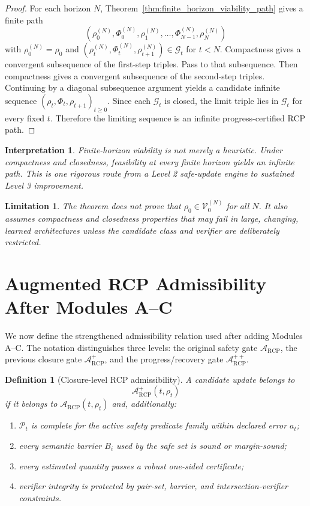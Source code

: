 \documentclass[11pt]{article}
\newtheorem{definition}[theorem]{Definition}
\newtheorem{interpretation}[theorem]{Interpretation}
\newtheorem{limitation}[theorem]{Limitation}
\newcommand{\Acal}{\mathcal{A}}
\newcommand{\Pcal}{\mathcal{P}}
\newcommand{\Gcal}{\mathcal{G}}
\newcommand{\1}{\mathbf{1}}
\newcommand{\RCP}{\mathrm{RCP}}
\providecommand{\Vcal}{\mathcal{V}}
\begin{document}
\begin{proof}
For each horizon \(N\), Theorem~\ref{thm:finite_horizon_viability_path} gives a finite path
\[
(\rho_0^{(N)},\Phi_0^{(N)},\rho_1^{(N)},\dots,
\Phi_{N-1}^{(N)},\rho_N^{(N)})
\]
with \(\rho_0^{(N)}=\rho_0\) and \((\rho_t^{(N)},\Phi_t^{(N)},\rho_{t+1}^{(N)})\in\Gcal_t\) for \(t<N\).  Compactness gives a convergent subsequence of the first-step triples.  Pass to that subsequence.  Then compactness gives a convergent subsequence of the second-step triples.  Continuing by a diagonal subsequence argument yields a candidate infinite sequence \((\rho_t,\Phi_t,\rho_{t+1})_{t\ge0}\).  Since each \(\Gcal_t\) is closed, the limit triple lies in \(\Gcal_t\) for every fixed \(t\).  Therefore the limiting sequence is an infinite progress-certified RCP path.
\end{proof}

\begin{interpretation}
Finite-horizon viability is not merely a heuristic.  Under compactness and closedness, feasibility at every finite horizon yields an infinite path.  This is one rigorous route from a Level 2 safe-update engine to sustained Level 3 improvement.
\end{interpretation}

\begin{limitation}
The theorem does not prove that \(\rho_0\in\Vcal_0^{(N)}\) for all \(N\).  It also assumes compactness and closedness properties that may fail in large, changing, learned architectures unless the candidate class and verifier are deliberately restricted.
\end{limitation}

\section{Augmented RCP Admissibility After Modules A--C}
\label{sec:augmented_admissibility}

We now define the strengthened admissibility relation used after adding Modules A--C.  The notation distinguishes three levels: the original safety gate \(\Acal_{\RCP}\), the previous closure gate \(\Acal_{\RCP}^{+}\), and the progress/recovery gate \(\Acal_{\RCP}^{++}\).

\begin{definition}[Closure-level RCP admissibility]
A candidate update belongs to
\[
\Acal_{\RCP}^{+}(t,\rho_t)
\]
if it belongs to \(\Acal_{\RCP}(t,\rho_t)\) and, additionally:
\begin{enumerate}[label=(\alph*)]
    \item \(\Pcal_t\) is complete for the active safety predicate family within declared error \(a_t\);
    \item every semantic barrier \(B_i\) used by the safe set is sound or margin-sound;
    \item every estimated quantity passes a robust one-sided certificate;
    \item verifier integrity is protected by pair-set, barrier, and intersection-verifier constraints.
\end{enumerate}
\end{definition}
\end{document}
